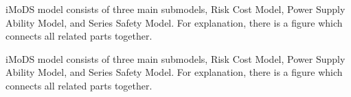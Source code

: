 \documentclass[12pt, a4paper, onecolumn]{elegantpaper}  %
\begin{document}
\begin{flushleft}
iMoDS model consists of three main submodels, Risk Cost Model, Power Supply Ability Model, and Series Safety Model. For explanation, there is a figure which connects all related parts together.
\end{flushleft}

\begin{flushright}
iMoDS model consists of three main submodels, Risk Cost Model, Power Supply Ability Model, and Series Safety Model. For explanation, there is a figure which connects all related parts together.
\end{flushright}

\end{document}
